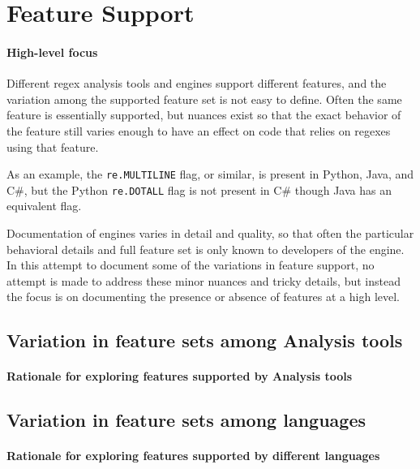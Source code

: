 \section{Feature Support}

\paragraph{High-level focus} Different regex analysis tools and engines support different features, and the variation among the supported feature set is not easy to define.  Often the same feature is essentially supported, but nuances exist so that the exact behavior of the feature still varies enough to have an effect on code that relies on regexes using that feature.

As an example, the {\tt re.MULTILINE} flag, or similar, is present in Python, Java, and C\#, but  the Python {\tt re.DOTALL} flag is not present in C\# though Java has an equivalent flag.

Documentation of engines varies in detail and quality, so that often the particular behavioral details and full feature set is only known to developers of the engine.  In this attempt to document some of the variations in feature support, no attempt is made to address these minor nuances and tricky details, but instead the focus is on documenting the presence or absence of features at a high level.



\subsection{Variation in feature sets among Analysis tools}

\paragraph{Rationale for exploring features supported by Analysis tools} 



\subsection{Variation in feature sets among languages}
\label{sec:featureSupport}

\paragraph{Rationale for exploring features supported by different languages} 

